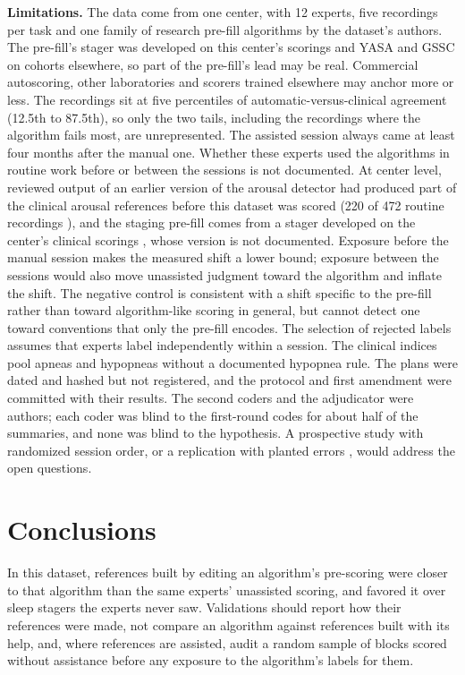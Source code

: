 \documentclass[11pt]{article}
\begin{document}
\textbf{Limitations.} The data come from one center, with 12 experts, five recordings per task and one family of research
pre-fill algorithms by the dataset's authors. The pre-fill's stager was developed on this center's scorings and YASA
and GSSC on cohorts elsewhere, so part of the pre-fill's lead may be real. Commercial autoscoring, other laboratories
and scorers trained elsewhere may anchor more or less. The recordings sit at five percentiles of automatic-versus-clinical agreement (12.5th to 87.5th), so only the
two tails, including the recordings where the algorithm fails most, are unrepresented. The assisted session always came at least four months after the manual one. Whether these experts used the
algorithms in routine work before or between the sessions is not documented. At center level, reviewed output of an earlier version of the arousal detector had produced part of the clinical arousal references before this dataset was scored (220 of 472
routine recordings \citep{alvarezestevez2019}), and the staging pre-fill comes from a stager developed on the center's
clinical scorings \citep{alvarezestevez2021}, whose version is not documented. Exposure before the manual session makes the measured shift a lower bound; exposure between the sessions would
also move unassisted judgment toward the algorithm and inflate the shift. The negative control is consistent with a shift specific to the pre-fill rather than toward algorithm-like scoring
in general, but cannot detect one toward conventions that only the pre-fill encodes. The selection of rejected
labels assumes that experts label independently within a session. The clinical indices pool apneas and
hypopneas without a documented hypopnea rule. The plans were dated and hashed but not registered, and the protocol and first amendment were committed with
their results. The second coders and the adjudicator were authors; each coder was blind to the first-round codes for about half of
the summaries, and none was blind to the hypothesis. A prospective study with randomized session order, or a replication with planted errors \citep{holm2026}, would
address the open questions.

\section{Conclusions}

In this dataset, references built by editing an algorithm's pre-scoring were closer to that algorithm than the same
experts' unassisted scoring, and favored it over sleep stagers the experts never saw. Validations
should report how their references were made, not compare an algorithm against references built with its help, and, where references are assisted, audit a random sample of blocks scored without assistance before any exposure to the algorithm's labels for them.



\end{document}
